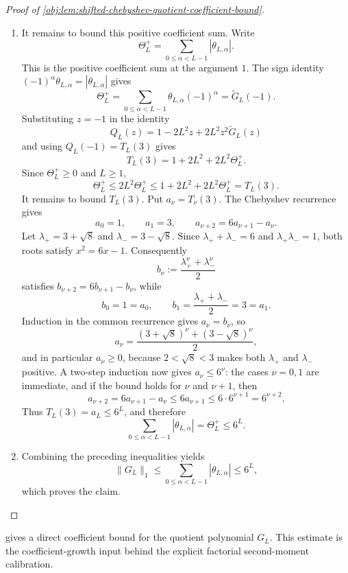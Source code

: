 \documentclass[11pt]{article}
\begin{document}
\begin{proof}[Proof of \cref{obj:lem:shifted-chebyshev-quotient-coefficient-bound}]
\begin{enumerate}
\item It remains to bound this positive coefficient sum. Write
\[
\Theta_L^+
=
\sum_{0\le \alpha<L-1}|\theta_{L,\alpha}|.
\]
This is the positive coefficient sum at the argument \(1\). The sign identity
\((-1)^\alpha\theta_{L,\alpha}=|\theta_{L,\alpha}|\) gives
\[
\Theta_L^+
=
\sum_{0\le \alpha<L-1}\theta_{L,\alpha}(-1)^\alpha
=
\widetilde G_L(-1).
\]
Substituting \(z=-1\) in the identity
\[
Q_L(z)=1-2L^2z+2L^2z^2\widetilde G_L(z)
\]
and using \(Q_L(-1)=T_L(3)\) gives
\[
T_L(3)=1+2L^2+2L^2\Theta_L^+ .
\]
Since \(\Theta_L^+\ge0\) and \(L\ge1\),
\[
\Theta_L^+
\le
2L^2\Theta_L^+
\le
1+2L^2+2L^2\Theta_L^+
=
T_L(3).
\]
It remains to bound \(T_L(3)\). Put \(a_\nu=T_\nu(3)\). The Chebyshev recurrence gives
\[
a_0=1,\qquad a_1=3,\qquad
a_{\nu+2}=6a_{\nu+1}-a_\nu .
\]
Let \(\lambda_+=3+\sqrt8\) and \(\lambda_-=3-\sqrt8\).  Since
\(\lambda_++\lambda_-=6\) and \(\lambda_+\lambda_-=1\), both roots satisfy
\(x^2=6x-1\).  Consequently
\[
b_\nu:=\frac{\lambda_+^\nu+\lambda_-^\nu}{2}
\]
satisfies \(b_{\nu+2}=6b_{\nu+1}-b_\nu\), while
\[
b_0=1=a_0,\qquad b_1=\frac{\lambda_++\lambda_-}{2}=3=a_1.
\]
Induction in the common recurrence gives \(a_\nu=b_\nu\), so
\[
a_\nu
=
\frac{(3+\sqrt8)^\nu+(3-\sqrt8)^\nu}{2},
\]
and in particular \(a_\nu\ge0\), because \(2<\sqrt8<3\) makes both
\(\lambda_+\) and \(\lambda_-\) positive. A two-step induction now gives \(a_\nu\le6^\nu\): the cases \(\nu=0,1\) are immediate, and if the bound holds for \(\nu\) and \(\nu+1\), then
\[
a_{\nu+2}=6a_{\nu+1}-a_\nu
\le 6a_{\nu+1}
\le 6\cdot 6^{\nu+1}
=6^{\nu+2}.
\]
Thus \(T_L(3)=a_L\le6^L\), and therefore
\[
\sum_{0\le \alpha<L-1}|\theta_{L,\alpha}|
=
\Theta_L^+
\le 6^L .
\]

\item Combining the preceding inequalities yields
\[
\|G_L\|_1
\le
\sum_{0\le \alpha<L-1}|\theta_{L,\alpha}|
\le
6^L,
\]
which proves the claim. %
\end{enumerate}
\end{proof}

 gives a direct coefficient bound for the quotient polynomial \(G_L\). This estimate is the coefficient-growth input behind the explicit factorial second-moment calibration.
\end{document}
